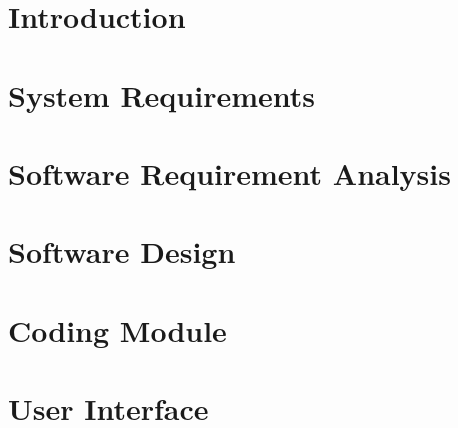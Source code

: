 \documentclass[12pt]{report}
\begin{document}

\begin{screen}
\ppttitle
\end{screen}
\footskip 0.7cm
\thispagestyle{empty} 
\pagetitle
\newpage
{}
\cfoot{\thepage}

%

%

\newpage
\tableofcontents
\newpage
\listoffigures
\newpage

\cfoot{\thepage}
\newpage
\chapter{Introduction}

\newpage
\chapter{System Requirements}

\chapter{Software Requirement Analysis}

\chapter{Software Design}


\chapter{Coding Module}

\chapter{User Interface}

%

\end{document}
